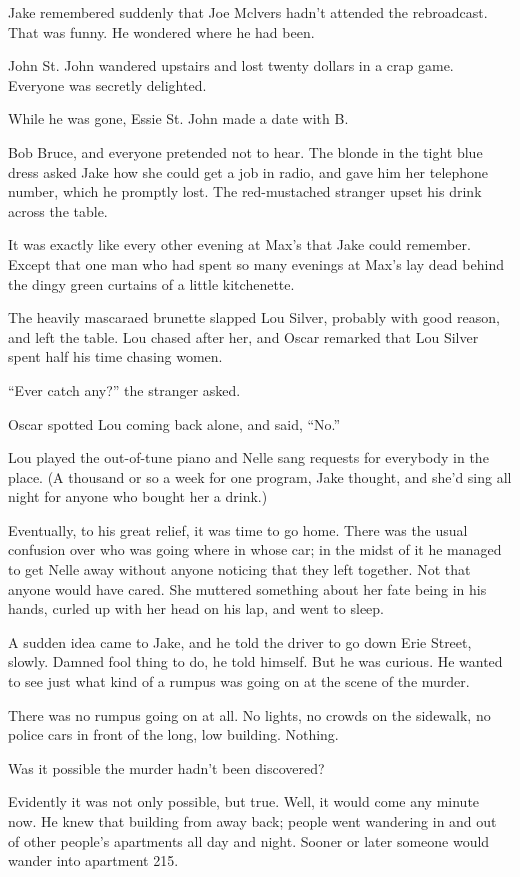 \documentclass{novel}
\begin{document}
Jake remembered suddenly that Joe Mclvers hadn’t attended the rebroadcast. That was funny. He wondered where he had been.

John St. John wandered upstairs and lost twenty dollars in a crap game. Everyone was secretly delighted.

While he was gone, Essie St. John made a date with B.

Bob Bruce, and everyone pretended not to hear. The blonde in the tight blue dress asked Jake how she could get a job in radio, and gave him her telephone number, which he promptly lost. The red-mustached stranger upset his drink across the table.

It was exactly like every other evening at Max’s that Jake could remember. Except that one man who had spent so many evenings at Max’s lay dead behind the dingy green curtains of a little kitchenette.

The heavily mascaraed brunette slapped Lou Silver, probably with good reason, and left the table. Lou chased after her, and Oscar remarked that Lou Silver spent half his time chasing women.

“Ever catch any?” the stranger asked.

Oscar spotted Lou coming back alone, and said, “No.”

Lou played the out-of-tune piano and Nelle sang requests for everybody in the place. (A thousand or so a week for one program, Jake thought, and she’d sing all night for anyone who bought her a drink.)

Eventually, to his great relief, it was time to go home. There was the usual confusion over who was going where in whose car; in the midst of it he managed to get Nelle away without anyone noticing that they left together. Not that anyone would have cared. She muttered something about her fate being in his hands, curled up with her head on his lap, and went to sleep.

A sudden idea came to Jake, and he told the driver to go down Erie Street, slowly. Damned fool thing to do, he told himself. But he was curious. He wanted to see just what kind of a rumpus was going on at the scene of the murder.

There was no rumpus going on at all. No lights, no crowds on the sidewalk, no police cars in front of the long, low building. Nothing.

Was it possible the murder hadn’t been discovered?

Evidently it was not only possible, but true. Well, it would come any minute now. He knew that building from away back; people went wandering in and out of other people’s apartments all day and night. Sooner or later someone would wander into apartment 215.
\end{document}
